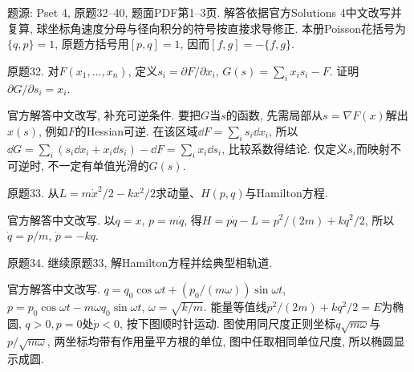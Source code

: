 题源: Pset 4, 原题32--40, 题面PDF第1--3页. 解答依据官方Solutions 4中文改写并复算, 球坐标角速度分母与径向积分的符号按直接求导修正. 本册Poisson花括号为$\{q,p\}=1$, 原题方括号用$[p,q]=1$, 因而$[f,g]=-\{f,g\}$.

\begin{exercise}
原题32. 对$F(x_1,\ldots,x_n)$, 定义$s_i=\partial F/\partial x_i$, $G(s)=\sum_ix_is_i-F$. 证明$\partial G/\partial s_i=x_i$.
\end{exercise}
\begin{solution}
官方解答中文改写, 补充可逆条件. 要把$G$当$s$的函数, 先需局部从$s=\nabla F(x)$解出$x(s)$, 例如$F$的Hessian可逆. 在该区域$\dd F=\sum_is_i\dd x_i$, 所以$\dd G=\sum_i(s_i\dd x_i+x_i\dd s_i)-\dd F=\sum_ix_i\dd s_i$, 比较系数得结论. 仅定义$s_i$而映射不可逆时, 不一定有单值光滑的$G(s)$.
\end{solution}

\begin{exercise}
原题33. 从$L=m\dot x^2/2-kx^2/2$求动量、$H(p,q)$与Hamilton方程.
\end{exercise}
\begin{solution}
官方解答中文改写. 以$q=x$, $p=m\dot q$, 得$H=p\dot q-L=p^2/(2m)+kq^2/2$, 所以$\dot q=p/m$, $\dot p=-kq$.
\end{solution}

\begin{exercise}
原题34. 继续原题33, 解Hamilton方程并绘典型相轨道.
\end{exercise}
\begin{solution}
官方解答中文改写. $q=q_0\cos\omega t+(p_0/(m\omega))\sin\omega t$, $p=p_0\cos\omega t-m\omega q_0\sin\omega t$, $\omega=\sqrt{k/m}$. 能量等值线$p^2/(2m)+kq^2/2=E$为椭圆, $q>0,p=0$处$\dot p<0$, 按下图顺时针运动. 图使用同尺度正则坐标$q\sqrt{m\omega}$与$p/\sqrt{m\omega}$, 两坐标均带有作用量平方根的单位, 图中任取相同单位尺度, 所以椭圆显示成圆.
\end{solution}
\begin{center}
\end{center}

